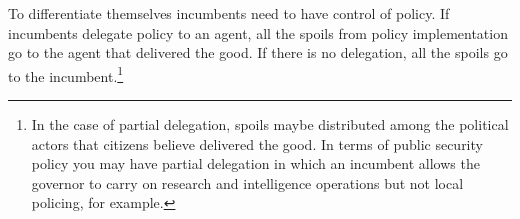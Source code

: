 \documentclass[12pt]{amsart}
\makeatletter
\def\subsection{\@startsection{subsection}{2}
	\z@{.8\linespacing\@plus.7\linespacing}{.7\linespacing}{\large}}
\numberwithin{equation}{section}
\theoremstyle{definition}
\theoremstyle{definition}
\theoremstyle{definition}
\makeatother
\begin{document}

To differentiate themselves incumbents need to have control of policy. If incumbents delegate policy to an agent, all the spoils from policy implementation go to the agent that delivered the good. If there is no delegation, all the spoils go to the incumbent.\footnote{In the case of partial delegation, spoils maybe distributed among the political actors that citizens believe delivered the good. In terms of public security policy you may have partial delegation in which an incumbent allows the governor to carry on research and intelligence operations but not local policing, for example.} 
              
\end{document}
